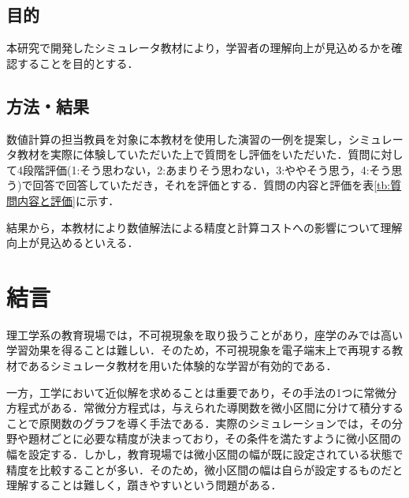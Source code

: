 \documentclass[a4paper, 12pt]{ltjsarticle}
\begin{document}
\subsection{目的}
本研究で開発したシミュレータ教材により，学習者の理解向上が見込めるかを確認することを目的とする．
\subsection{方法・結果}
数値計算の担当教員を対象に本教材を使用した演習の一例を提案し，シミュレータ教材を実際に体験していただいた上で質問をし評価をいただいた．質問に対して4段階評価(1:そう思わない，2:あまりそう思わない，3:ややそう思う，4:そう思う)で回答で回答していただき，それを評価とする．質問の内容と評価を表\ref{tb:質問内容と評価}に示す．

\begin{table}[htbp]
\centering
\caption{質問内容と評価}
\label{tb:質問内容と評価}
\end{table}

結果から，本教材により数値解法による精度と計算コストへの影響について理解向上が見込めるといえる．

\clearpage
\section{結言}
理工学系の教育現場では，不可視現象を取り扱うことがあり，座学のみでは高い学習効果を得ることは難しい．そのため，不可視現象を電子端末上で再現する教材であるシミュレータ教材を用いた体験的な学習が有効的である．

一方，工学において近似解を求めることは重要であり，その手法の1つに常微分方程式がある．常微分方程式は，与えられた導関数を微小区間に分けて積分することで原関数のグラフを導く手法である．実際のシミュレーションでは，その分野や題材ごとに必要な精度が決まっており，その条件を満たすように微小区間の幅を設定する．しかし，教育現場では微小区間の幅が既に設定されている状態で精度を比較することが多い．そのため，微小区間の幅は自らが設定するものだと理解することは難しく，躓きやすいという問題がある．
\end{document}
